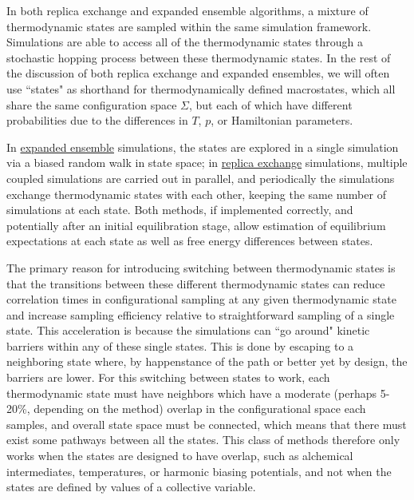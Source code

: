 \documentclass[9pt,review]{livecoms}
\begin{document}
In both replica exchange and expanded ensemble algorithms, a mixture of thermodynamic states are sampled within the same simulation framework. Simulations are able to access all of the  thermodynamic states through a stochastic hopping process between these thermodynamic states.  In the rest of the discussion of both replica exchange and expanded ensembles, we will often use ``states" as shorthand for thermodynamically defined macrostates, which all share the same configuration space $\Sigma$, but each of which have different probabilities due to the differences in $T$, $p$, or Hamiltonian parameters.

In \hyperlink{ref:ExpEns} {expanded ensemble} simulations, the states are explored in a single simulation via a biased random walk in state space; in \hyperlink{ref:RepEx} {replica exchange} simulations, multiple coupled simulations are carried out in parallel, and periodically the simulations exchange thermodynamic states with each other, keeping the same number of simulations at each state. Both methods, if implemented correctly, and potentially after an initial equilibration stage, allow estimation of equilibrium expectations at each state as well as free energy differences between states.

The primary reason for introducing switching between thermodynamic states is that the transitions between these different thermodynamic states can reduce correlation times in configurational sampling at any given thermodynamic state and increase sampling efficiency relative to straightforward sampling of a single state. This acceleration is because the simulations can ``go around"  kinetic barriers within any of these single states. This is done by escaping to a neighboring state where, by happenstance of the path or better yet by design, the barriers are lower.  For this switching between states to work, each thermodynamic state must have neighbors which have a moderate (perhaps 5-20\%, depending on the method) overlap in the configurational space each samples, and overall state space must be connected, which means that there must exist some pathways between all the states. This class of methods therefore only works when the states are designed to have overlap, such as alchemical intermediates, temperatures, or harmonic biasing potentials, and not when the states are defined by values of a collective variable.
\end{document}
